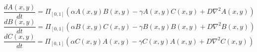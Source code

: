\documentclass{article}
\begin{document}
\[
\frac{d A(x,y)}{d t} = \Pi_{[0,1]} \left( \alpha A(x,y) B(x,y) - \gamma A(x,y) C(x,y) + D \nabla^2 A(x,y) \right)
\]
\[
\frac{d B(x,y)}{d t} = \Pi_{[0,1]} \left( \alpha B(x,y) C(x,y) - \gamma B(x,y) B(x,y) + D \nabla^2 B(x,y) \right)
\]
\[
\frac{d C(x,y)}{d t} = \Pi_{[0,1]} \left( \alpha C(x,y) A(x,y) - \gamma C(x,y) A(x,y) + D \nabla^2 C(x,y) \right)
\]
\end{document}
